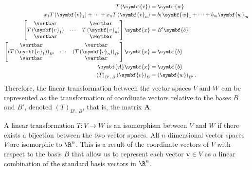 \documentclass{article}
\begin{document}
\begin{align*}
    T\left( \symbf{v} \right)                                                  & = \symbf{w}                                  \\
    x_1 T\left( \symbf{v}_1 \right) + \cdots + x_n T\left( \symbf{v}_n \right) & = b_1 \symbf{w}_1 + \cdots + b_m \symbf{w}_m \\
    \begin{bmatrix}
        \vertbar                    &        & \vertbar                    \\
        T\left( \symbf{v}_1 \right) & \cdots & T\left( \symbf{v}_n \right) \\
        \vertbar                    &        & \vertbar
    \end{bmatrix}
    \symbf{x}                                                                  & = B' \symbf{b}                               \\
    \begin{bmatrix}
        \vertbar                                        &        & \vertbar                                        \\
        \left( T\left( \symbf{v}_1 \right) \right)_{B'} & \cdots & \left( T\left( \symbf{v}_n \right) \right)_{B'} \\
        \vertbar                                        &        & \vertbar
    \end{bmatrix}
    \symbf{x}                                                                  & = \symbf{b}                                  \\
    \symbf{A} \symbf{x}                                                        & = \symbf{b}                                  \\
    \left( T \right)_{B',\: B} \left( \symbf{v} \right)_B                      & = \left( \symbf{w} \right)_{B'}.
\end{align*}
Therefore, the linear transformation between the vector spaces \(V\) and \(W\)
can be represented as the transformation of coordinate vectors relative to the bases \(B\) and \(B'\), denoted \(\left( T \right)_{B',\: B}\), that is, the matrix \(\symbf{A}\).
\begin{definition}[Isomorphism]
    A linear transformation \(T : V \to W\) is an isomorphism between
    \(V\) and \(W\) if there exists a bijection between the two vector
    spaces.
    All \(n\) dimensional vector spaces \(V\) are isomorphic to
    \(\R^n\). This is a result of the coordinate vectors of \(V\) with
    respect to the basis \(B\) that allow us to represent each vector
    \(\symbf{v} \in V\) as a linear combination of the standard basis
    vectors in \(\R^n\).
\end{definition}
\end{document}
